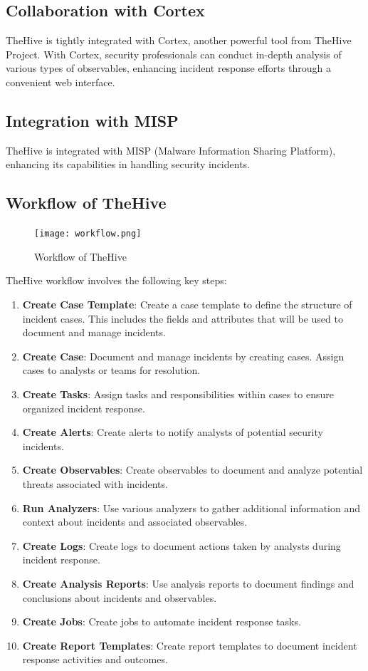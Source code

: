 \documentclass{article}
\begin{document}
\subsection{Collaboration with Cortex}
TheHive is tightly integrated with Cortex, another powerful tool from TheHive Project. With Cortex, security professionals can conduct in-depth analysis of various types of observables, enhancing incident response efforts through a convenient web interface.

\subsection{Integration with MISP}
TheHive is integrated with MISP (Malware Information Sharing Platform), enhancing its capabilities in handling security incidents.


\subsection{Workflow of TheHive}
\begin{figure}[ht]
    \centering
    \texttt{[image: workflow.png]}
    \caption{Workflow of TheHive}
    \label{fig:workflow}
\end{figure}

TheHive workflow involves the following key steps:

\begin{enumerate}
    \item \textbf{Create Case Template}: Create a case template to define the structure of incident cases. This includes the fields and attributes that will be used to document and manage incidents.
    \item \textbf{Create Case}: Document and manage incidents by creating cases. Assign cases to analysts or teams for resolution.
    \item \textbf{Create Tasks}: Assign tasks and responsibilities within cases to ensure organized incident response.
    \item \textbf{Create Alerts}: Create alerts to notify analysts of potential security incidents.
    \item \textbf{Create Observables}: Create observables to document and analyze potential threats associated with incidents.
    \item \textbf{Run Analyzers}: Use various analyzers to gather additional information and context about incidents and associated observables.
    \item \textbf{Create Logs}: Create logs to document actions taken by analysts during incident response.
    \item \textbf{Create Analysis Reports}: Use analysis reports to document findings and conclusions about incidents and observables.
    \item \textbf{Create Jobs}: Create jobs to automate incident response tasks.
    \item \textbf{Create Report Templates}: Create report templates to document incident response activities and outcomes.
\end{enumerate}
\end{document}
